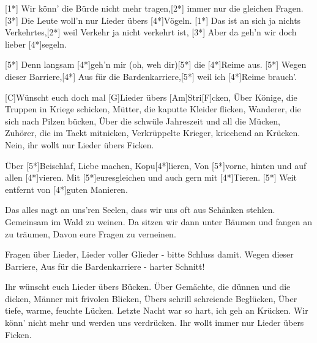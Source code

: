

\hspace*{\fill}{\footnotesize(Capo 4. Bund)}

\begin{guitar}
	[1*] Wir könn' die Bürde nicht mehr tragen,[2*] immer nur die gleichen Fragen.
	[3*] Die Leute woll'n nur Lieder übers [4*]Vögeln.
	[1*] Das ist an sich ja nichts Verkehrtes,[2*] weil Verkehr ja nicht verkehrt ist,
	[3*] Aber da geh'n wir doch lieber [4*]segeln.
	
	[5*] Denn langsam [4*]geh'n mir (oh, weh dir)[5*] die [4*]Reime aus.
	[5*] Wegen dieser Barriere,[4*] Aus für die Bardenkarriere,[5*] weil ich [4*]Reime brauch'.
	
	[C]Wünscht euch doch mal [G]Lieder übers [Am]Stri[F]cken,
	Über Könige, die Truppen in Kriege schicken,
	Mütter, die kaputte Kleider flicken,
	Wanderer, die sich nach Pilzen bücken,
	Über die schwüle Jahreszeit und all die Mücken,
	Zuhörer, die im Tackt mitnicken,
	Verkrüppelte Krieger, kriechend an Krücken.
	Nein, ihr wollt nur Lieder übers Ficken.
	
	Über [5*]Beischlaf, Liebe machen, Kopu[4*]lieren,
	Von [5*]vorne, hinten und auf allen [4*]vieren.
	Mit [5*]euresgleichen und auch gern mit [4*]Tieren.
	[5*] Weit entfernt von [4*]guten Manieren.
	
	\pagebreak
	
	Das alles nagt an uns'ren Seelen, dass wir uns oft aus Schänken stehlen.
	Gemeinsam im Wald zu weinen.
	Da sitzen wir dann unter Bäumen und fangen an zu träumen,
	Davon eure Fragen zu verneinen.
	
	Fragen über Lieder, Lieder voller Glieder - bitte Schluss damit.
	Wegen dieser Barriere, Aus für die Bardenkarriere - harter Schnitt!
	
	Ihr wünscht euch Lieder übers Bücken.
	Über Gemächte, die dünnen und die dicken,
	Männer mit frivolen Blicken,
	Übers schrill schreiende Beglücken,
	Über tiefe, warme, feuchte Lücken.
	Letzte Nacht war so hart, ich geh an Krücken.
	Wir könn' nicht mehr und werden uns verdrücken.
	Ihr wollt immer nur Lieder übers Ficken.
	

\end{guitar}
